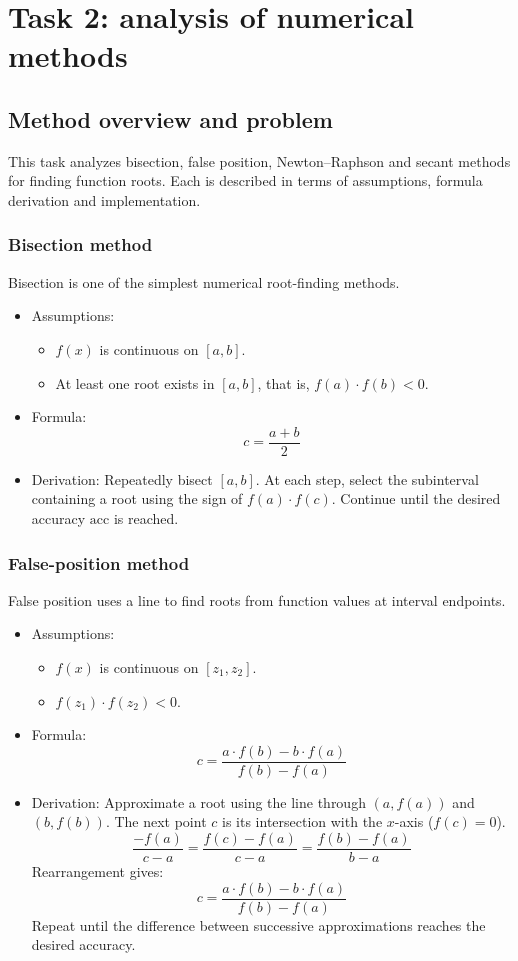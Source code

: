 \section{Task 2: analysis of numerical methods}

\subsection{Method overview and problem}
This task analyzes bisection, false position, Newton--Raphson and secant methods for finding function roots. Each is described in terms of assumptions, formula derivation and implementation.

\subsubsection{Bisection method}
Bisection is one of the simplest numerical root-finding methods.

\begin{itemize}
    \item Assumptions:
    \begin{itemize}
        \item \( f(x) \) is continuous on \([a, b]\).
        \item At least one root exists in \([a, b]\), that is, \( f(a) \cdot f(b) < 0 \).
    \end{itemize}
    \item Formula:
    \[ c = \frac{a + b}{2} \]
    \item Derivation:
    Repeatedly bisect \([a, b]\). At each step, select the subinterval containing a root using the sign of \( f(a) \cdot f(c) \). Continue until the desired accuracy \( \text{acc} \) is reached.
\end{itemize}

\subsubsection{False-position method}
False position uses a line to find roots from function values at interval endpoints.

\begin{itemize}
    \item Assumptions:
    \begin{itemize}
        \item \( f(x) \) is continuous on \([z_1, z_2]\).
        \item \( f(z_1) \cdot f(z_2) < 0 \).
    \end{itemize}
    \item Formula:
    \[ c = \frac{a \cdot f(b) - b \cdot f(a)}{f(b) - f(a)} \]
    \item Derivation:
    Approximate a root using the line through \((a, f(a))\) and \((b, f(b))\). The next point \( c \) is its intersection with the \( x \)-axis ($f(c) = 0$).
    \[
     \frac{-f(a)}{c-a} = \frac{f(c) - f(a)}{c-a} = \frac{f(b) - f(a)}{b-a}
    \]
    Rearrangement gives:
    \[ c = \frac{a \cdot f(b) - b \cdot f(a)}{f(b) - f(a)} \]
    Repeat until the difference between successive approximations reaches the desired accuracy.
\end{itemize}

